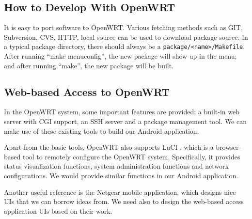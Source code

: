 	\subsection{How to Develop With OpenWRT}
	
	It is easy to port software to OpenWRT. Various fetching methods such as GIT, Subversion, CVS, HTTP, local source can be used to download package source. In a typical package directory, there should always be a \verb|package/<name>/Makefile|. After running ``make menuconfig'', the new package will show up in the menu; and after running ``make'', the new package will be built.
	
	\subsection{Web-based Access to OpenWRT}
	In the OpenWRT system, some important features are provided: a built-in web server with CGI support, an SSH server and a package management tool. We can make use of these existing tools to build our Android application.
	
	Apart from the basic tools, OpenWRT also supports LuCI \cite{LuCI}, which is a browser-based tool to remotely configure the OpenWRT system. Specifically, it provides status visualization functions, system administration functions and network configurations. We would provide similar functions in our Android application.
	
	Another useful reference is the Netgear \cite{netgear} mobile application, which designs nice UIs that we can borrow ideas from. We need also to design the web-based access application UIs based on their work.